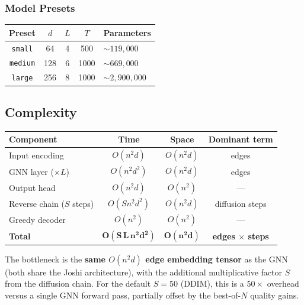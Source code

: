 \documentclass[12pt,a4paper]{article}
\begin{document}
\subsubsection*{Model Presets}

\begin{center}
\begin{tabularx}{\linewidth}{cccc>{\centering\arraybackslash}X}
\toprule
\textbf{Preset} & $d$ & $L$ & $T$ & \textbf{Parameters} \\
\midrule
\texttt{small}  & 64  & 4 & 500  & $\sim 119{,}000$ \\
\texttt{medium} & 128 & 6 & 1000 & $\sim 669{,}000$ \\
\texttt{large}  & 256 & 8 & 1000 & $\sim 2{,}900{,}000$ \\
\bottomrule
\end{tabularx}
\end{center}

\subsection{Complexity}

\begin{center}
\begin{tabularx}{\linewidth}{Xccc}
\toprule
\textbf{Component} & \textbf{Time} & \textbf{Space} & \textbf{Dominant term} \\
\midrule
Input encoding          & $O(n^2 d)$     & $O(n^2 d)$    & edges \\
GNN layer ($\times L$)  & $O(n^2 d^2)$   & $O(n^2 d)$    & edges \\
Output head             & $O(n^2 d)$     & $O(n^2)$      & --- \\
Reverse chain ($S$ steps) & $O(S n^2 d^2)$ & $O(n^2 d)$  & diffusion steps \\
Greedy decoder          & $O(n^2)$       & $O(n^2)$      & --- \\
\midrule
\textbf{Total}          & $\boldsymbol{O(S\,L\,n^2 d^2)}$
                        & $\boldsymbol{O(n^2 d)}$
                        & \textbf{edges $\times$ steps} \\
\bottomrule
\end{tabularx}
\end{center}

The bottleneck is the \textbf{same $O(n^2 d)$ edge embedding tensor} as the GNN
(both share the Joshi architecture), with the additional multiplicative factor $S$
from the diffusion chain.
For the default $S=50$ (DDIM), this is a $50\times$ overhead versus a single GNN
forward pass, partially offset by the best-of-$N$ quality gains.
\end{document}
